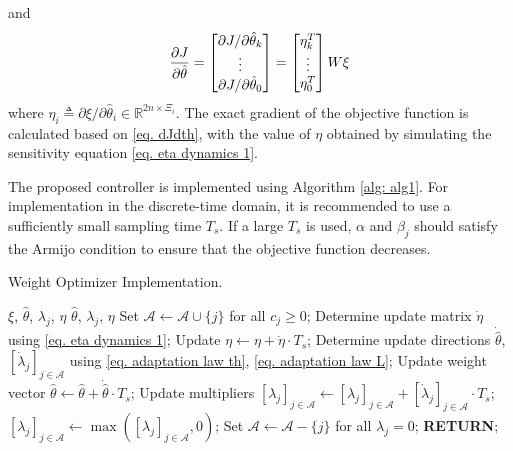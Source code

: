 \documentclass[lettersize,journal]{IEEEtran}
\begin{document}
and
\begin{equation}\label{eq. grad_J}
    {\partial J\over\partial\hat\theta}
    =
    \begin{bmatrix}
        \partial J/\partial\hat\theta_k\\\vdots\\\partial J/\partial\hat\theta_0\\
    \end{bmatrix}    =
    \begin{bmatrix}
        \eta_k^T\\\vdots\\\eta_0^T\\
    \end{bmatrix}
    W
    \xi
\end{equation}
where $\eta_i \triangleq \partial \xi/\partial \hat\theta_i\in\mathbb R^{2n\times \Xi_i}$. The exact gradient of the objective function is calculated based on \eqref{eq. dJdth}, with the value of $\eta$ obtained by simulating the sensitivity equation \eqref{eq. eta dynamics 1}.

The proposed controller is implemented using Algorithm \ref{alg: alg1}. For implementation in the discrete-time domain, it is recommended to use a sufficiently small sampling time $T_s$. If a large $T_s$ is used, $\alpha$ and $\beta_j$ should satisfy the Armijo condition \cite[Chap.~3 eq.~(3.4)]{RN22} to ensure that the objective function decreases.

\begin{algorithm}[!t]
    \caption{Weight Optimizer Implementation.}\label{alg: alg1}
    \begin{algorithmic}[1]
        \renewcommand{\algorithmicrequire}{\textbf{Input:}}
        \renewcommand{\algorithmicensure}{\textbf{Output:}}
        \REQUIRE $\xi$, $\hat\theta$, $\lambda_j$, $\eta$
        \ENSURE  $\hat\theta$, $\lambda_j$, $\eta$
        \STATE Set $\mathcal A \leftarrow \mathcal A\cup \{j\}$ for all $c_j\ge0$;
        \STATE Determine update matrix $\dot\eta$ using \eqref{eq. eta dynamics 1};
        \STATE Update $\eta\leftarrow \eta +\dot\eta\cdot T_s$; 
        \STATE Determine update directions $\dot{\hat\theta}$, $[\dot\lambda_j]_{j\in\mathcal A}$ using \eqref{eq. adaptation law th}, \eqref{eq. adaptation law L};
        \STATE Update weight vector $\hat\theta\leftarrow \hat\theta+\dot{\hat\theta}\cdot T_s$;
        \STATE Update multipliers $[\lambda_j]_{j\in\mathcal A}\leftarrow [\lambda_j]_{j\in\mathcal A}+[\dot\lambda_j]_{j\in\mathcal A}\cdot T_s$;
        \STATE $[\lambda_j]_{j\in\mathcal A}\leftarrow \max([\lambda_j]_{j\in\mathcal A}, 0)$;
        \STATE Set $\mathcal A \leftarrow \mathcal A - \{j\}$ for all $\lambda_j=0$;
        \STATE \textbf{RETURN};
    \end{algorithmic}
    \label{alg1}
\end{algorithm}
\end{document}
